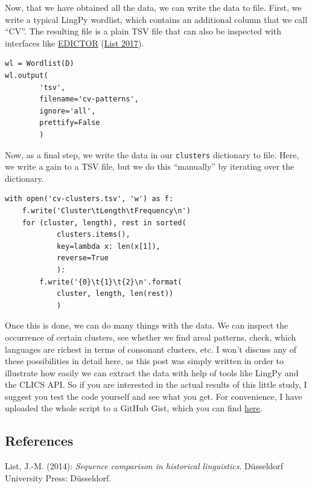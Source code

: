 \documentclass[
  english,
  a4paper,
  oneside,tablecaptionabove
]{scrbook}
\newcommand{\passthrough}[1]{#1}
\begin{document}
Now, that we have obtained all the data, we can write the data to file.
First, we write a typical LingPy wordlist, which contains an additional
column that we call \enquote{CV}. The resulting file is a plain TSV file
that can also be inspected with interfaces like
\href{http://edictor.digling.org}{EDICTOR} (\href{http://bibliography.lingpy.org?key=List2017d}{List 2017}).

\begin{lstlisting}
wl = Wordlist(D)
wl.output(
        'tsv', 
        filename='cv-patterns', 
        ignore='all', 
        prettify=False
        )
\end{lstlisting}

Now, as a final step, we write the data in our
\passthrough{\lstinline!clusters!} dictionary to file. Here, we write a
gain to a TSV file, but we do this \enquote{manually} by iterating over
the dictionary.

\begin{lstlisting}
with open('cv-clusters.tsv', 'w') as f:
    f.write('Cluster\tLength\tFrequency\n')
    for (cluster, length), rest in sorted(
            clusters.items(), 
            key=lambda x: len(x[1]),
            reverse=True
            ):
        f.write('{0}\t{1}\t{2}\n'.format(
            cluster, length, len(rest))
            )
\end{lstlisting}

Once this is done, we can do many things with the data. We can inspect
the occurrence of certain clusters, see whether we find areal patterns,
check, which languages are richest in terms of consonant clusters, etc.
I won't discuss any of these possibilities in detail here, as this post
was simply written in order to illustrate how easily we can extract the
data with help of tools like LingPy and the CLICS API. So if you are
interested in the actual results of this little study, I suggest you
test the code yourself and see what you get. For convenience, I have
uploaded the whole script to a GitHub Gist, which you can find
\href{https://gist.github.com/LinguList/1056960125ca79428b420257fa4b02eb}{here}.

\hypertarget{references}{\subsection*{References}\label{references}}

List, J.-M. (2014): \emph{Sequence comparison in historical
linguistics}. Düsseldorf University Press: Düsseldorf.
\end{document}
